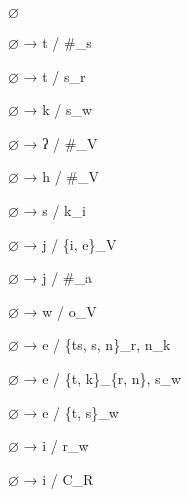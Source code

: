\begin{center}\textbf{$\varnothing$}\end{center}
\begin{multicols}{4}
\noindent $\varnothing$ → t / \#\_s

\noindent $\varnothing$ → t / s\_r

\noindent $\varnothing$ → k / s\_w

\noindent $\varnothing$ → ʔ / \#\_V

\noindent $\varnothing$ → h / \#\_V

\noindent $\varnothing$ → s / k\_i

\noindent $\varnothing$ → j / \{i, e\}\_V

\noindent $\varnothing$ → j / \#\_a

\noindent $\varnothing$ → w / o\_V

\noindent $\varnothing$ → e / \{ts, s, n\}\_r, n\_k

\noindent $\varnothing$ → e / \{t, k\}\_\{r, n\}, s\_w

\noindent $\varnothing$ → e / \{t, s\}\_w

\noindent $\varnothing$ → i / r\_w

\noindent $\varnothing$ → i / C\_R
\end{multicols}
